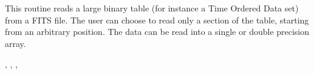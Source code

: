 
\sloppy


 \section[input\_tod*]{ }
\label{sub:input_tod}
\author{Eric Hivon \& Frode K.~Hansen}

\begin{facility}
{This routine reads a large binary table (for instance a Time Ordered Data
 set) from a FITS file. The user can choose to read only a section of the table,
 starting from an arbitrary position. 
The data can be read into a single or double precision array.}
{\modFitstools}
\end{facility}

\begin{f90format}
{%
, %
, %
, %
 }
\end{f90format}
\aboutoptional

